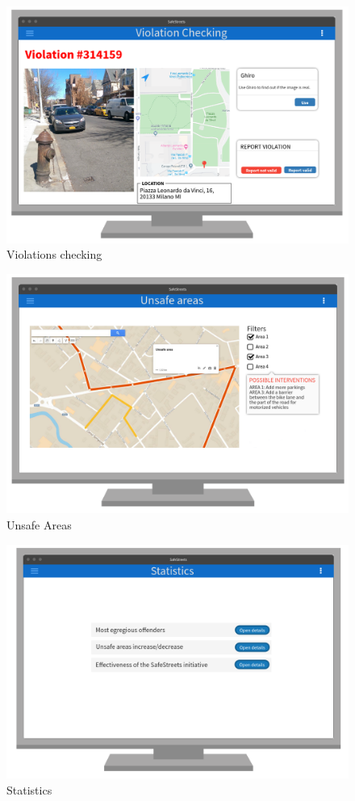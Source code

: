 \documentclass{article}
\begin{document}
\begin{figure}[H]
    \centering
    \includegraphics[scale=0.35]{Images/WEBViolationChecking}
    \caption{Violations checking}
\end{figure}
\begin{figure}[H]
    \centering
    \includegraphics[scale=0.35]{Images/WEBUnsafeAreas}
    \caption{Unsafe Areas}
\end{figure}
\begin{figure}[H]
    \centering
    \includegraphics[scale=0.35]{Images/StatisticsWeb}
    \caption{Statistics}
\end{figure}
\newpage
\newpage
\end{document}
